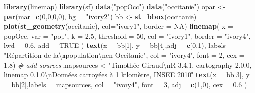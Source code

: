 \documentclass[]{book}
\newenvironment{Shaded}{\begin{snugshade}}{\end{snugshade}}
\newcommand{\KeywordTok}[1]{\textcolor[rgb]{0.13,0.29,0.53}{\textbf{#1}}}
\newcommand{\DataTypeTok}[1]{\textcolor[rgb]{0.13,0.29,0.53}{#1}}
\newcommand{\DecValTok}[1]{\textcolor[rgb]{0.00,0.00,0.81}{#1}}
\newcommand{\FloatTok}[1]{\textcolor[rgb]{0.00,0.00,0.81}{#1}}
\newcommand{\CharTok}[1]{\textcolor[rgb]{0.31,0.60,0.02}{#1}}
\newcommand{\StringTok}[1]{\textcolor[rgb]{0.31,0.60,0.02}{#1}}
\newcommand{\CommentTok}[1]{\textcolor[rgb]{0.56,0.35,0.01}{\textit{#1}}}
\newcommand{\OtherTok}[1]{\textcolor[rgb]{0.56,0.35,0.01}{#1}}
\newcommand{\NormalTok}[1]{#1}
\begin{document}
\begin{Shaded}
\begin{Highlighting}[]
\KeywordTok{library}\NormalTok{(linemap)}
\KeywordTok{library}\NormalTok{(sf)}
\KeywordTok{data}\NormalTok{(}\StringTok{"popOcc"}\NormalTok{)}
\KeywordTok{data}\NormalTok{(}\StringTok{"occitanie"}\NormalTok{)}
\NormalTok{opar <-}\StringTok{ }\KeywordTok{par}\NormalTok{(}\DataTypeTok{mar=}\KeywordTok{c}\NormalTok{(}\DecValTok{0}\NormalTok{,}\DecValTok{0}\NormalTok{,}\DecValTok{0}\NormalTok{,}\DecValTok{0}\NormalTok{), }\DataTypeTok{bg =} \StringTok{"ivory2"}\NormalTok{)}
\NormalTok{bb <-}\StringTok{ }\KeywordTok{st_bbox}\NormalTok{(occitanie)}
\KeywordTok{plot}\NormalTok{(}\KeywordTok{st_geometry}\NormalTok{(occitanie), }\DataTypeTok{col=}\StringTok{"ivory1"}\NormalTok{, }\DataTypeTok{border =} \OtherTok{NA}\NormalTok{)}
\KeywordTok{linemap}\NormalTok{(}
  \DataTypeTok{x =}\NormalTok{ popOcc, }
  \DataTypeTok{var =} \StringTok{"pop"}\NormalTok{, }
  \DataTypeTok{k =} \FloatTok{2.5}\NormalTok{, }
  \DataTypeTok{threshold =} \DecValTok{50}\NormalTok{,}
  \DataTypeTok{col =} \StringTok{"ivory1"}\NormalTok{, }
  \DataTypeTok{border =} \StringTok{"ivory4"}\NormalTok{, }
  \DataTypeTok{lwd =} \FloatTok{0.6}\NormalTok{, }
  \DataTypeTok{add =} \OtherTok{TRUE}
\NormalTok{)}
\KeywordTok{text}\NormalTok{(}\DataTypeTok{x =}\NormalTok{ bb[}\DecValTok{1}\NormalTok{], }\DataTypeTok{y =}\NormalTok{ bb[}\DecValTok{4}\NormalTok{],}\DataTypeTok{adj =} \KeywordTok{c}\NormalTok{(}\DecValTok{0}\NormalTok{,}\DecValTok{1}\NormalTok{),}
     \DataTypeTok{labels =} \StringTok{"Répartition de la}\CharTok{\textbackslash{}n}\StringTok{population}\CharTok{\textbackslash{}n}\StringTok{en Occitanie"}\NormalTok{,  }
     \DataTypeTok{col =} \StringTok{"ivory4"}\NormalTok{, }\DataTypeTok{font =} \DecValTok{2}\NormalTok{,  }\DataTypeTok{cex =} \FloatTok{1.8}\NormalTok{)}
\CommentTok{# add sources}
\NormalTok{mapsources <-}\StringTok{"Timothée Giraud}\CharTok{\textbackslash{}n}\StringTok{R 3.4.1, cartography 2.0.0, linemap 0.1.0}\CharTok{\textbackslash{}n}\StringTok{Données carroyées à 1 kilomètre, INSEE 2010"}
\KeywordTok{text}\NormalTok{(}\DataTypeTok{x =}\NormalTok{ bb[}\DecValTok{3}\NormalTok{], }\DataTypeTok{y =}\NormalTok{ bb[}\DecValTok{2}\NormalTok{],}\DataTypeTok{labels =}\NormalTok{ mapsources,  }
     \DataTypeTok{col =} \StringTok{"ivory4"}\NormalTok{, }\DataTypeTok{font =} \DecValTok{3}\NormalTok{, }\DataTypeTok{adj =} \KeywordTok{c}\NormalTok{(}\DecValTok{1}\NormalTok{,}\DecValTok{0}\NormalTok{), }\DataTypeTok{cex =} \FloatTok{0.6}\NormalTok{ )}
\end{Highlighting}
\end{Shaded}
\end{document}
